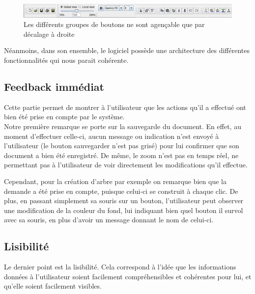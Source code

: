 \documentclass[12pt, a4paper]{article}
\begin{document}
\begin{figure}[h]
\begin{center}
   \includegraphics[scale = 0.5]{agencement.jpg}
	\caption{Les différents groupes de boutons ne sont agençable que par décalage à droite}
	\end{center}
\end{figure}


Néanmoins, dans son ensemble, le logiciel possède une architecture des différentes fonctionnalités qui nous parait cohérente.  

\subsection{Feedback immédiat}
Cette partie permet de montrer à l'utilisateur que les actions qu'il a effectué ont bien été prise en compte par le système.\\


Notre première remarque se porte sur la sauvegarde du document. En effet, au moment d'effectuer celle-ci, aucun message ou indication n'est envoyé à l'utilisateur (le bouton sauvegarder n'est pas grisé) pour lui confirmer que son document a bien été enregistré. De même, le zoom n'est pas en temps réel, ne permettant pas à l'utilisateur de voir directement les modifications qu'il effectue. 


Cependant, pour la création d'arbre par exemple on remarque bien que la demande a été prise en compte, puisque celui-ci se construit à chaque clic. De plus, en passant simplement sa souris sur un bouton, l'utilisateur peut observer une modification de la couleur du fond, lui indiquant bien quel bouton il survol avec sa souris, en plus d'avoir un message donnant le nom de celui-ci.
\newpage
\subsection{Lisibilité}
Le dernier point est la lisibilité. Cela correspond à l'idée que les informations données à l’utilisateur soient facilement compréhensibles et cohérentes pour lui, et qu'elle soient facilement visibles.
\end{document}
